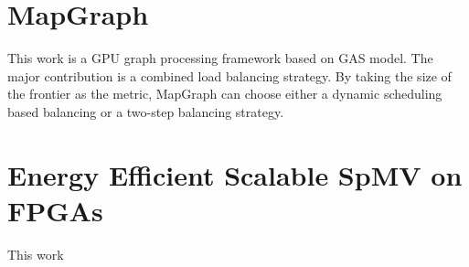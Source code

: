 \section{MapGraph}
This work \cite{fu2014mapgraph} is a GPU graph processing framework based on GAS model.
The major contribution is a combined load balancing strategy. By taking the size of
the frontier as the metric, MapGraph can choose either a dynamic scheduling
based balancing or a two-step balancing strategy.

\section{Energy Efficient Scalable SpMV on FPGAs}
This work 
